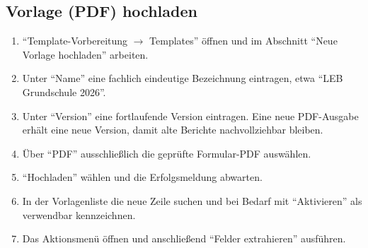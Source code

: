 \documentclass[12pt,a4paper]{article}
\begin{document}
\subsection{Vorlage (PDF) hochladen}\label{sec:template-upload}
\begin{enumerate}
  \item \enquote{Template-Vorbereitung \(\rightarrow\) Templates} öffnen und im Abschnitt \enquote{Neue Vorlage hochladen} arbeiten.
  \item Unter \enquote{Name} eine fachlich eindeutige Bezeichnung eintragen, etwa \enquote{LEB Grundschule 2026}.
  \item Unter \enquote{Version} eine fortlaufende Version eintragen. Eine neue PDF-Ausgabe erhält eine neue Version, damit alte Berichte nachvollziehbar bleiben.
  \item Über \enquote{PDF} ausschließlich die geprüfte Formular-PDF auswählen.
  \item \enquote{Hochladen} wählen und die Erfolgsmeldung abwarten.
  \item In der Vorlagenliste die neue Zeile suchen und bei Bedarf mit \enquote{Aktivieren} als verwendbar kennzeichnen.
  \item Das Aktionsmenü öffnen und anschließend \enquote{Felder extrahieren} ausführen.
\end{enumerate}
\end{document}
